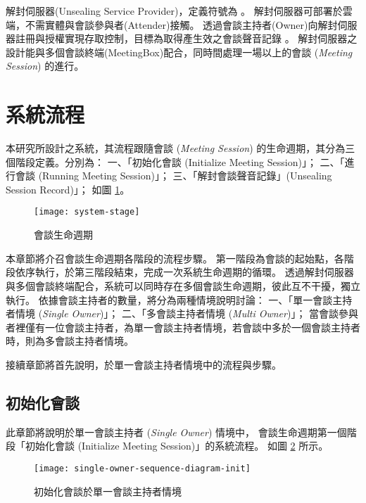     解封伺服器(Unsealing Service Provider)，定義符號為 \DEFserver。
解封伺服器可部署於雲端，不需實體與會談參與者(Attender)接觸。
透過會談主持者(Owner)向解封伺服器註冊與授權實現存取控制，目標為取得產生效之會談聲音記錄 \DEFrecREV。
解封伺服器之設計能與多個會談終端(MeetingBox)配合，同時間處理一場以上的會談 ({\it Meeting Session}) 的進行。


\section{系統流程}\label{sec:system-flow}

    本研究所設計之系統，其流程跟隨會談 ({\it Meeting Session}) 的生命週期，其分為三個階段定義。分別為：
一、「初始化會談 (Initialize Meeting Session)」；
二、「進行會談 (Running Meeting Session)」；
三、「解封會談聲音記錄」(Unsealing Session Record)」；
如圖 \ref{fig:system-stage}。

\begin{figure}[H]
    \centering
    \texttt{[image: system-stage]}
    \caption{會談生命週期}\label{fig:system-stage}
\end{figure}

    本章節將介召會談生命週期各階段的流程步驟。
第一階段為會談的起始點，各階段依序執行，於第三階段結束，完成一次系統生命週期的循環。
透過解封伺服器與多個會談終端配合，系統可以同時存在多個會談生命週期，彼此互不干擾，獨立執行。
依據會談主持者的數量，將分為兩種情境說明討論：
一、「單一會談主持者情境 ({\it Single Owner})」；
二、「多會談主持者情境 ({\it Multi Owner})」；
當會談參與者裡僅有一位會談主持者，為單一會談主持者情境，若會談中多於一個會談主持者時，則為多會談主持者情境。

    接續章節將首先說明，於單一會談主持者情境中的流程與步驟。


\subsection{初始化會談}\label{subsec:initialize}

    此章節將說明於單一會談主持者 ({\it Single Owner}) 情境中，
會談生命週期第一個階段「初始化會談 (Initialize Meeting Session)」的系統流程。
如圖 \ref{fig:s-o-init} 所示。

\begin{figure}[H]
    \centering
    \texttt{[image: single-owner-sequence-diagram-init]}
    \caption{初始化會談於單一會談主持者情境}\label{fig:s-o-init}
\end{figure}


